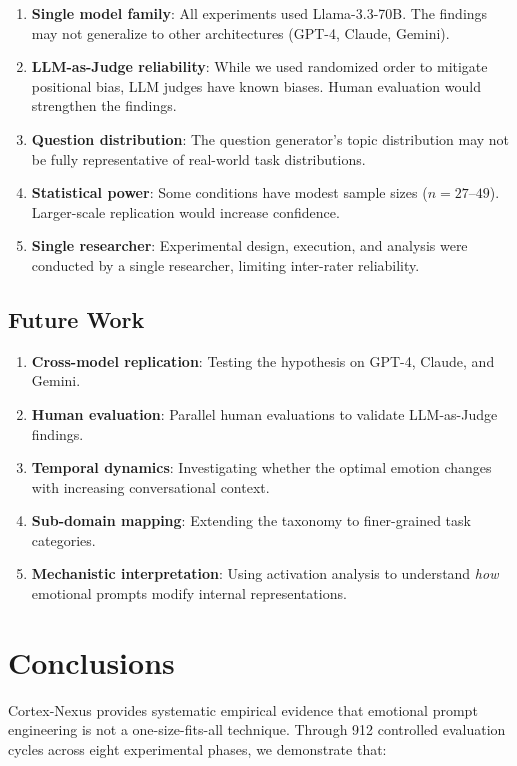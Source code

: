 \documentclass[lineno]{wlpeerj}
\begin{document}
\begin{enumerate}
    \item \textbf{Single model family}: All experiments used Llama-3.3-70B. The findings may not generalize to other architectures (GPT-4, Claude, Gemini).
    \item \textbf{LLM-as-Judge reliability}: While we used randomized order to mitigate positional bias, LLM judges have known biases. Human evaluation would strengthen the findings.
    \item \textbf{Question distribution}: The question generator's topic distribution may not be fully representative of real-world task distributions.
    \item \textbf{Statistical power}: Some conditions have modest sample sizes ($n = 27$--$49$). Larger-scale replication would increase confidence.
    \item \textbf{Single researcher}: Experimental design, execution, and analysis were conducted by a single researcher, limiting inter-rater reliability.
\end{enumerate}

\subsection{Future Work}

\begin{enumerate}
    \item \textbf{Cross-model replication}: Testing the hypothesis on GPT-4, Claude, and Gemini.
    \item \textbf{Human evaluation}: Parallel human evaluations to validate LLM-as-Judge findings.
    \item \textbf{Temporal dynamics}: Investigating whether the optimal emotion changes with increasing conversational context.
    \item \textbf{Sub-domain mapping}: Extending the taxonomy to finer-grained task categories.
    \item \textbf{Mechanistic interpretation}: Using activation analysis to understand \textit{how} emotional prompts modify internal representations.
\end{enumerate}

\section{Conclusions}

Cortex-Nexus provides systematic empirical evidence that emotional prompt engineering is not a one-size-fits-all technique. Through 912 controlled evaluation cycles across eight experimental phases, we demonstrate that:
\end{document}
